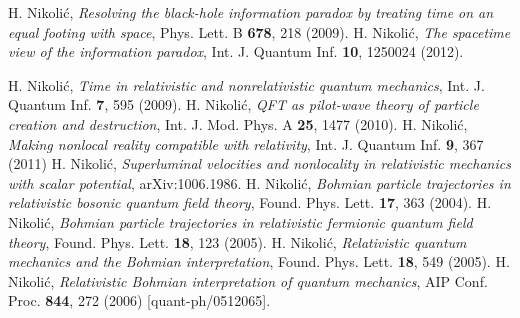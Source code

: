 \documentclass[12pt,twoside]{report} %
\begin{document}
%
%


\begin{thebibliography}{99}



H. Nikoli\'c, {\it Resolving the black-hole information paradox by treating time on an equal footing with space},
Phys. Lett. B {\bf 678}, 218 (2009).
H. Nikoli\'c, {\it The spacetime view of the information paradox},
Int. J. Quantum Inf. {\bf 10}, 1250024 (2012).

H. Nikoli\'c, {\it Time in relativistic and nonrelativistic quantum mechanics}, 
Int. J. Quantum Inf. {\bf 7}, 595 (2009).
H. Nikoli\'c, {\it QFT as pilot-wave theory of particle creation and destruction}, 
Int. J. Mod. Phys. A {\bf 25}, 1477 (2010).
H. Nikoli\'c, {\it Making nonlocal reality compatible with relativity}, 
Int. J. Quantum Inf. {\bf 9}, 367 (2011)
H. Nikoli\'c, {\it Superluminal velocities and nonlocality in relativistic mechanics with scalar potential}, arXiv:1006.1986.
H. Nikoli\'c, {\it Bohmian particle trajectories in relativistic bosonic quantum field theory}, 
Found. Phys. Lett. {\bf 17}, 363 (2004).
H. Nikoli\'c, {\it Bohmian particle trajectories in relativistic fermionic quantum field theory}, 
Found. Phys. Lett. {\bf 18}, 123 (2005).
H. Nikoli\'c, {\it Relativistic quantum mechanics and the Bohmian interpretation}, 
Found. Phys. Lett. {\bf 18}, 549 (2005).
H. Nikoli\'c, {\it Relativistic Bohmian interpretation of quantum mechanics}, 
AIP Conf. Proc. {\bf 844}, 272 (2006) [quant-ph/0512065].




\end{thebibliography}
\end{document}
